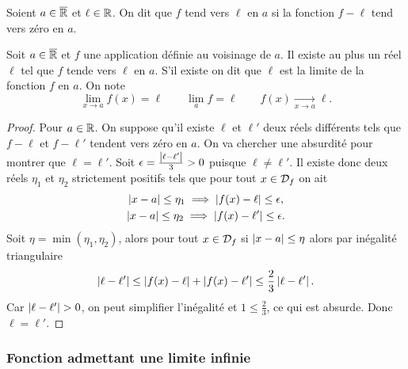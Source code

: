 \begin{defdef}
  Soient $a \in \overline{\mathbb{R}}$ et $\ell \in \mathbb{R}$. On dit que $f$ tend vers $\ell$ en $a$ si la fonction $f-\ell$ tend vers zéro en $a$.
\end{defdef}
\begin{theo}
  Soit $a \in \overline{\mathbb{R}}$ et $f$ une application définie au voisinage de $a$. Il existe au plus un réel $\ell$ tel que $f$ tende vers $\ell$ en $a$. S'il existe on dit que $\ell$ est la limite de la fonction $f$ en $a$. On note
\begin{equation}
  \lim\limits_{x \to a}f(x)=\ell \qquad \lim\limits_{a}f=\ell \qquad f(x) \underset{x \to a}{\longrightarrow} \ell.
\end{equation}
\end{theo}
\begin{proof}
Pour $a \in \mathbb{R}$. On suppose qu'il existe $\ell$ et $\ell'$ deux réels différents tels que $f-\ell$ et $f-\ell'$ tendent vers zéro en $a$. On va chercher une absurdité pour montrer que $\ell=\ell'$. Soit $\epsilon = \frac{\left\lvert\ell-\ell'\right\rvert}{3} > 0$ puisque $\ell \neq \ell'$. Il existe donc deux réels $\eta_1$ et $\eta_2$ strictement positifs tels que pour tout $x \in \mathcal{D}_{f}$ on ait
\begin{gather}
  \left\lvert x-a\right\rvert \leq \eta_1 \implies \left\lvert f(x)-\ell\right\rvert \leq \epsilon, \\ 
  \left\lvert x-a\right\rvert \leq \eta_2 \implies \left\lvert f(x)-\ell'\right\rvert \leq \epsilon.
\end{gather}
Soit $\eta=\min(\eta_1, \eta_2)$, alors pour tout $x \in \mathcal{D}_{f}$ si $\left\lvert x-a\right\rvert \leq \eta$ alors par inégalité triangulaire
\begin{equation}
  \left\lvert\ell-\ell'\right\rvert \leq \left\lvert f(x)-\ell\right\rvert + \left\lvert f(x)-\ell'\right\rvert \leq \frac{2}{3}\left\lvert\ell-\ell'\right\rvert.
\end{equation}
Car $\left\lvert\ell-\ell'\right\rvert >0$, on peut simplifier l'inégalité et $1 \leq \frac{2}{3}$, ce qui est absurde. Donc $\ell=\ell'$.
\end{proof}

\subsubsection{Fonction admettant une limite infinie}

